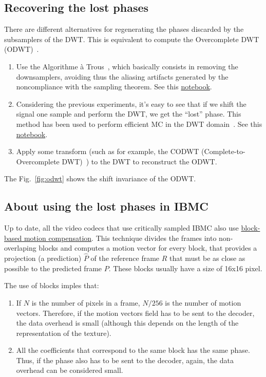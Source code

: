 \subsection{Recovering the lost phases}
There are different alternatives for regenerating the phases discarded
by the subsamplers of the DWT. This is equivalent to compute the
Overcomplete DWT (ODWT)~\cite{mallat1999wavelet}.
\begin{enumerate}
\item Use the Algorithme \`a Trous~\cite{mallat1999wavelet}, which
  basically consists in removing the downsamplers, avoiding thus the
  aliasing artifacts generated by the noncompliance with the sampling
  theorem. See this
  \href{https://github.com/Sistemas-Multimedia/Sistemas-Multimedia.github.io/blob/master/milestones/11-MC_in_DWT_domain/regenerating.ipynb}{notebook}.
\item Considering the previous experiments, it's easy to see that if
  we shift the signal one sample and perform the DWT, we get the
  ``lost'' phase. This method has been used to perform efficient MC in
  the DWT domain~\cite{park2000motion,li2001all}. See this \href{https://github.com/Sistemas-Multimedia/Sistemas-Multimedia.github.io/blob/master/milestones/11-MC_in_DWT_domain/ODWT_with_delay.ipynb}{notebook}.
\item Apply some transform (such as for example, the CODWT
  (Complete-to-Overcomplete DWT)~\cite{andreopoulos2005complete}) to
  the DWT to reconstruct the ODWT.
\end{enumerate}
The Fig.~\ref{fig:odwt} shows the shift invariance of the ODWT.

\subsection{About using the lost phases in IBMC}
Up to date, all the video codecs that use critically sampled IBMC also
use
\href{https://vicente-gonzalez-ruiz.github.io/video_compression/}{block-based
  motion compensation}. This technique divides the frames into
non-overlaping blocks and computes a motion vector for every block,
that provides a projection (a prediction) $\hat{P}$ of the reference
frame $R$ that must be as close as possible to the predicted frame
$P$. These blocks usually have a size of 16x16 pixel.

The use of blocks imples that:
\begin{enumerate}
\item If $N$ is the number of pixels in a frame, $N/256$ is the number
  of motion vectors. Therefore, if the motion vectors field has to be
  sent to the decoder, the data overhead is small (although this
  depends on the length of the representation of the texture).
\item All the coefficients that correspond to the same block has the
  same phase. Thus, if the phase also has to be sent to the decoder,
  again, the data overhead can be considered small.
\end{enumerate}

